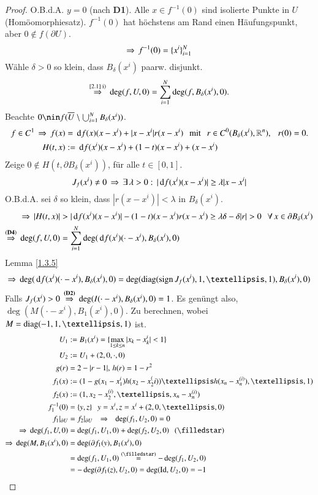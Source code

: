 \begin{proof}
    O.B.d.A. $y=0$ (nach \textbf{D1}). Alle $x\in f^{-1} (0)$ sind isolierte Punkte in $U$
    (Homöomorphiesatz).
    $f^{-1}(0)$ hat höchstens am Rand einen Häufungspunkt, aber $0\nin f(\partial U)$.
    \[
        \Rightarrow \, f^{-1}(0)= \{ x^i \}_{i=1}^N
    \]
    Wähle $\delta >0$ so klein, dass $B_\delta(x^i)$ paarw. disjunkt.
    \[
        \overset{\text{\ref{2.1} i)}}{\Rightarrow} \, \deg(f,U,0)=\sum_{i=1}^N \deg(f,B_\delta(x^i),0).
    \]
    Beachte $0\nin f(\ol U \setminus \bigcup_{i=1}^N B_\delta(x^i))$.
    \begin{align*}
        f\in C^1 \, \Rightarrow \, f(x)&= \, \mathrm{d} f(x)(x-x^i) + |x-x^i| r(x-x^i) \hspace{.25cm} \text{mit} \hspace{.25cm} r\in C^0(B_\delta(x^i),\mathbb{R}^n), 
        \hspace{.25cm} r(0)=0.\\
           H(t,x) &:= \, \mathrm{d} f (x^i) (x-x^i)+ (1-t) (x-x^i)+(x-x^i)
    \end{align*}
    Zeige $0\nin H(t,\partial B_\delta(x^i))$, für alle $t\in [0,1]$.
    \[
        J_f(x^i)\neq 0 \, \Rightarrow \, \exists\, \lambda >0:\, |\, \mathrm{d} f(x^i)(x-x^i)|\geq \lambda|x-x^i|
    \]
    O.B.d.A. sei $\delta$ so klein, dass $|r(x-x^i)|<\lambda$ in $B_\delta (x^i)$.
    \begin{align*}
        \Ra\, | H(t,x) |&>|\d f(x^i)(x-x^i)|-(1-t)(x-x^i)r(x-x^i)\geq \lambda \delta - \delta|r|>0
        \qq \forall \, x\in \partial B_\delta (x^i)\\
        \overset{(\textbf{D4})}{\Ra} \, \deg(f,U,0)&=\sum_{i=1}^N\deg (\d f (x^i)(\cdot-x^i),
                B_\delta(x^i),0)
    \end{align*}
    Lemma \ref{1.3.5}
    \[
        \Ra \, \deg(\d f (x^i)(\cdot- x^i),B_\delta (x^i),0)= \deg(\diag(\sign J_f(x^i),1,…,1),
            B_\delta(x^i),0)
    \]
    Falls $J_f(x^i)>0\, \overset{\textbf{(D2)}}{\Rightarrow}\,\deg(I(\cdot-x^i),B_\delta (x^i),0)=1$. Es genüngt
    also, $\deg(M(\cdot-x^i),B_1(x^i),0)$. Zu berechnen, wobei $M=\diag(-1,1,…,1)$ ist.
    \begin{align*}
        U_1&:= B_1 (x^i) = \{ \max_{1\leq k\leq n} |x_k-x_k^i|<1 \}\\
        U_2&:= U_1+ (2,0,\cdot,0)\\
        g(r)&=2-|r-1|, \, h(r)=1-r^2\\
        f_1(x)&:= (1-g(x_1-x_1^i)h(x_2-x_2^(i))…h(x_n-x_n^{(i)}),…, 1)\\
        f_2(x)&:= (1,x_2-x_2^{(i)}, … , x_n-x_n^{(i)})\\
        f_1^{-1}(0)&= \{ y,z \} \qq y=x^i, z = x^i+(2,0,…,0)\\
        f_1|_{\partial U}&= f_2|_{\partial U} \qq \Ra \qq \deg(f_1,U_2,0)=0\\
        \Ra \, \deg (f_1,U,0)&= \deg(f_1,U_1,0)+ \deg(f_2,U_2,0) \qq (\star)\\
        \Ra \, \deg(M,B_1(x^i),0)&=\deg(\partial f_1(y),B_1(x^i), 0)\\
        &=\deg(f_1, U_1,0) \overset{(\star)}{=} -\deg (f_1,U_2,0)\\
        &= -\deg(\partial f_1(z),U_2,0)=\deg(\Id, U_2,0)=-1
    \end{align*}
    \[ \]
\end{proof}

